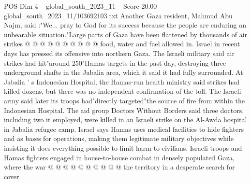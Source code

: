 \begin{textsample}{POS Dim 4 – global\_south\_2023\_11 – Score 20.00 – global\_south\_2023\_11/103692103.txt}
Another Gaza resident, Mahmud Abu Najm, said :"We... pray to God for its success because the people are enduring an unbearable situation."Large parts of Gaza have been flattened by thousands of air strikes @ @ @ @ @ @ @ @ @ @ food, water and fuel allowed in.
Israel in recent days has pressed its offensive into northern Gaza.
The Israeli military said air strikes had hit"around 250"Hamas targets in the past day, destroying three underground shafts in the Jabalia area, which it said it had fully surrounded.
At Jabalia ' s Indonesian Hospital, the Hamas-run health ministry said strikes had killed dozens, but there was no independent confirmation of the toll.
The Israeli army said later its troops had"directly targeted"the source of fire from within the Indonesian Hospital.
The aid group Doctors Without Borders said three doctors, including two it employed, were killed in an Israeli strike on the Al-Awda hospital in Jabalia refugee camp.
Israel says Hamas uses medical facilities to hide fighters and as bases for operations, making them legitimate military objectives while insisting it does everything possible to limit harm to civilians.
Israeli troops and Hamas fighters engaged in house-to-house combat in densely populated Gaza, where the war @ @ @ @ @ @ @ @ @ @ the territory in a desperate search for cover

\end{textsample}
